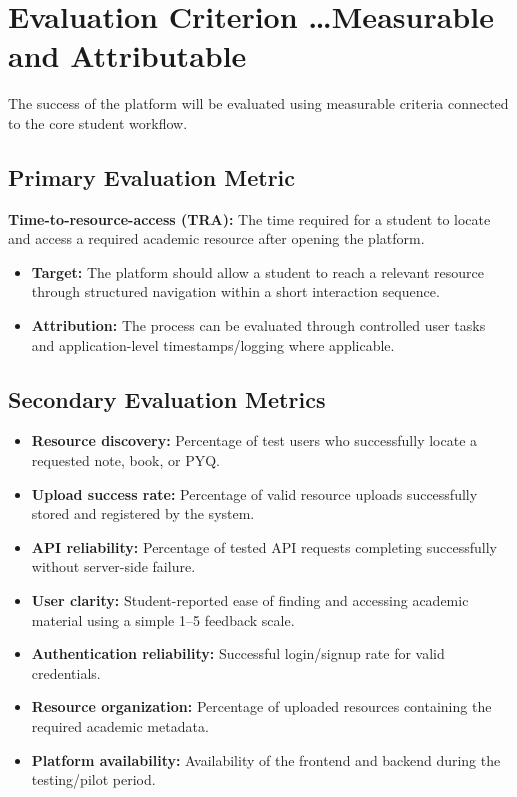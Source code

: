 \documentclass[11pt,a4paper]{article}
\begin{document}
\section{Evaluation Criterion \dots Measurable and Attributable}
The success of the platform will be evaluated using measurable criteria connected to the core student workflow.

\subsection{Primary Evaluation Metric}
\textbf{Time-to-resource-access (TRA):} The time required for a student to locate and access a required academic resource after opening the platform.
\begin{itemize}[leftmargin=*]
    \item \textbf{Target:} The platform should allow a student to reach a relevant resource through structured navigation within a short interaction sequence.
    \item \textbf{Attribution:} The process can be evaluated through controlled user tasks and application-level timestamps/logging where applicable.
\end{itemize}

\subsection{Secondary Evaluation Metrics}
\begin{itemize}[leftmargin=*]
    \item \textbf{Resource discovery:} Percentage of test users who successfully locate a requested note, book, or PYQ.
    \item \textbf{Upload success rate:} Percentage of valid resource uploads successfully stored and registered by the system.
    \item \textbf{API reliability:} Percentage of tested API requests completing successfully without server-side failure.
    \item \textbf{User clarity:} Student-reported ease of finding and accessing academic material using a simple 1--5 feedback scale.
    \item \textbf{Authentication reliability:} Successful login/signup rate for valid credentials.
    \item \textbf{Resource organization:} Percentage of uploaded resources containing the required academic metadata.
    \item \textbf{Platform availability:} Availability of the frontend and backend during the testing/pilot period.
\end{itemize}
\end{document}
